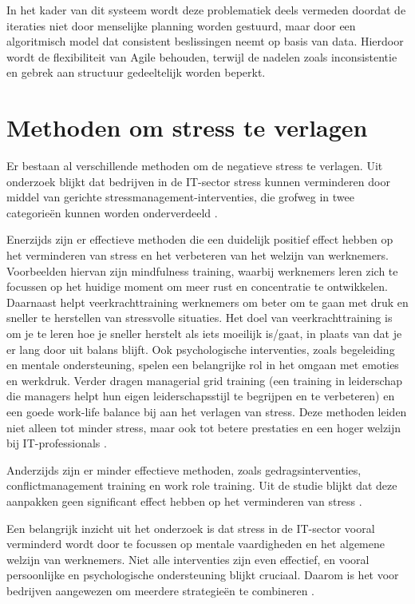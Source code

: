 In het kader van dit systeem wordt deze problematiek deels vermeden doordat de iteraties niet door menselijke planning worden gestuurd, maar door een algoritmisch model dat consistent beslissingen neemt op basis van data. Hierdoor wordt de flexibiliteit van Agile behouden, terwijl de nadelen zoals inconsistentie en gebrek aan structuur gedeeltelijk worden beperkt.

\section{Methoden om stress te verlagen}
\label{ch:methoden-om-stress-te-verlagen} 
\vspace{1em}Er bestaan al verschillende methoden om de negatieve stress te verlagen. Uit onderzoek blijkt dat bedrijven in de IT-sector stress kunnen verminderen door middel van gerichte stressmanagement-interventies, die grofweg in twee categorieën kunnen worden onderverdeeld \autocite{Iswarya_2024}.

Enerzijds zijn er effectieve methoden die een duidelijk positief effect hebben op het verminderen van stress en het verbeteren van het welzijn van werknemers. Voorbeelden hiervan zijn mindfulness training, waarbij werknemers leren zich te focussen op het huidige moment om meer rust en concentratie te ontwikkelen. Daarnaast helpt veerkrachttraining werknemers om beter om te gaan met druk en sneller te herstellen van stressvolle situaties. Het doel van veerkrachttraining is om je te leren hoe je sneller herstelt als iets moeilijk is/gaat, in plaats van dat je er lang door uit balans blijft. Ook psychologische interventies, zoals begeleiding en mentale ondersteuning, spelen een belangrijke rol in het omgaan met emoties en werkdruk. Verder dragen managerial grid training (een training in leiderschap die managers helpt hun eigen leiderschapsstijl te begrijpen en te verbeteren) en een goede work-life balance bij aan het verlagen van stress. Deze methoden leiden niet alleen tot minder stress, maar ook tot betere prestaties en een hoger welzijn bij IT-professionals \autocite{Iswarya_2024}.

Anderzijds zijn er minder effectieve methoden, zoals gedragsinterventies, conflictmanagement training en work role training. Uit de studie blijkt dat deze aanpakken geen significant effect hebben op het verminderen van stress \autocite{Iswarya_2024}.

Een belangrijk inzicht uit het onderzoek is dat stress in de IT-sector vooral verminderd wordt door te focussen op mentale vaardigheden en het algemene welzijn van werknemers. Niet alle interventies zijn even effectief, en vooral persoonlijke en psychologische ondersteuning blijkt cruciaal. Daarom is het voor bedrijven aangewezen om meerdere strategieën te combineren \autocite{Iswarya_2024}.

